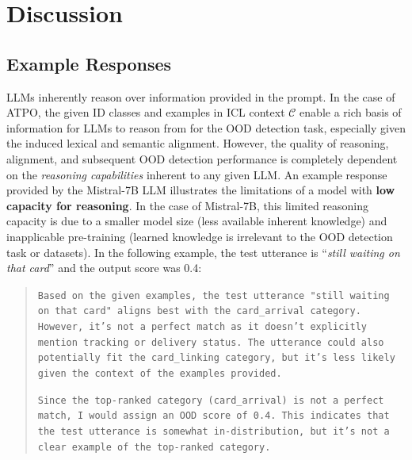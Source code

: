 \section{Discussion}
\label{sec:propwork-atpo-disc}



\subsection{Example Responses}

LLMs inherently reason over information provided in the prompt. In the case of ATPO, the given ID classes and examples in ICL context $\mathcal{C}$ enable a rich basis of information for LLMs to reason from for the OOD detection task, especially given the induced lexical and semantic alignment. However, the quality of reasoning, alignment, and subsequent OOD detection performance is completely dependent on the \textit{reasoning capabilities} inherent to any given LLM. An example response provided by the Mistral-7B LLM illustrates the limitations of a model with \textbf{low capacity for reasoning}. In the case of Mistral-7B, this limited reasoning capacity is due to a smaller model size (less available inherent knowledge) and inapplicable pre-training (learned knowledge is irrelevant to the OOD detection task or datasets). In the following example, the test utterance is ``\textit{still waiting on that card}'' and the output score was 0.4:

\begin{quote}
\texttt{Based on the given examples, the test utterance "still waiting on that card" aligns best with the card\_arrival category. However, it's not a perfect match as it doesn't explicitly mention tracking or delivery status. The utterance could also potentially fit the card\_linking category, but it's less likely given the context of the examples provided.}

\texttt{Since the top-ranked category (card\_arrival) is not a perfect match, I would assign an OOD score of 0.4. This indicates that the test utterance is somewhat in-distribution, but it's not a clear example of the top-ranked category.}
\end{quote}

